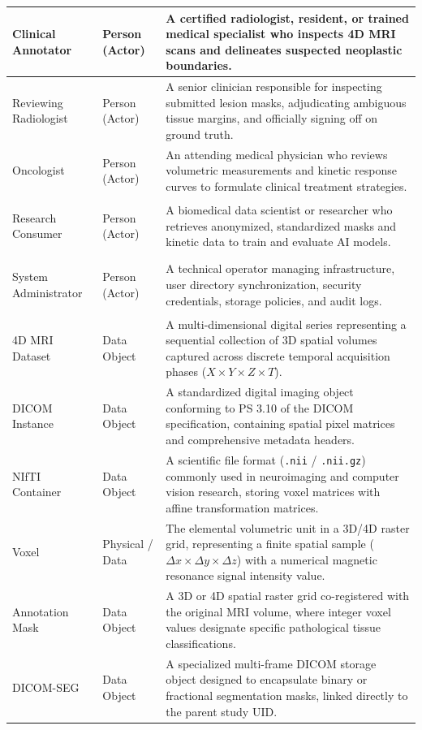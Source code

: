 \documentclass[11pt, a4paper]{article}
\begin{document}
\begin{tabularx}{\textwidth}{|>{\bfseries\raggedright\arraybackslash}p{3.6cm}|>{\raggedright\arraybackslash}p{2.9cm}|X|}
    Clinical Annotator & Person (Actor) & A certified radiologist, resident, or trained medical specialist who inspects 4D MRI scans and delineates suspected neoplastic boundaries. \\
    \hline
    Reviewing Radiologist & Person (Actor) & A senior clinician responsible for inspecting submitted lesion masks, adjudicating ambiguous tissue margins, and officially signing off on ground truth. \\
    \hline
    Oncologist & Person (Actor) & An attending medical physician who reviews volumetric measurements and kinetic response curves to formulate clinical treatment strategies. \\
    \hline
    Research Consumer & Person (Actor) & A biomedical data scientist or researcher who retrieves anonymized, standardized masks and kinetic data to train and evaluate AI models. \\
    \hline
    System Administrator & Person (Actor) & A technical operator managing infrastructure, user directory synchronization, security credentials, storage policies, and audit logs. \\
    \hline
    4D MRI Dataset & Data Object & A multi-dimensional digital series representing a sequential collection of 3D spatial volumes captured across discrete temporal acquisition phases ($X \times Y \times Z \times T$). \\
    \hline
    DICOM Instance & Data Object & A standardized digital imaging object conforming to PS 3.10 of the DICOM specification, containing spatial pixel matrices and comprehensive metadata headers. \\
    \hline
    NIfTI Container & Data Object & A scientific file format (\texttt{.nii} / \texttt{.nii.gz}) commonly used in neuroimaging and computer vision research, storing voxel matrices with affine transformation matrices. \\
    \hline
    Voxel & Physical / Data & The elemental volumetric unit in a 3D/4D raster grid, representing a finite spatial sample ($\Delta x \times \Delta y \times \Delta z$) with a numerical magnetic resonance signal intensity value. \\
    \hline
    Annotation Mask & Data Object & A 3D or 4D spatial raster grid co-registered with the original MRI volume, where integer voxel values designate specific pathological tissue classifications. \\
    \hline
    DICOM-SEG & Data Object & A specialized multi-frame DICOM storage object designed to encapsulate binary or fractional segmentation masks, linked directly to the parent study UID. \\

\end{tabularx}
\end{document}
